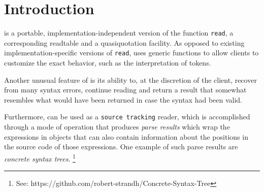 \chapter{Introduction}

\sysname{} is a portable, implementation-independent version of the
\commonlisp{} function \texttt{read}, a corresponding readtable and a
quasiquotation facility.  As opposed to existing
implementation-specific versions of \texttt{read}, \sysname{} uses
generic functions to allow clients to customize the exact behavior,
such as the interpretation of tokens.

Another unusual feature of \sysname{} is its ability to, at the
discretion of the client, recover from many syntax errors, continue
reading and return a result that somewhat resembles what would have
been returned in case the syntax had been valid.

Furthermore, \sysname{} can be used as a \texttt{source tracking}
reader, which is accomplished through a mode of operation that
produces \emph{parse results} which wrap the \commonlisp{} expressions
in objects that can also contain information about the positions in
the source code of those expressions.  One example of such parse
results are \emph{concrete syntax trees}.%
\footnote{See: https://github.com/robert-strandh/Concrete-Syntax-Tree}

